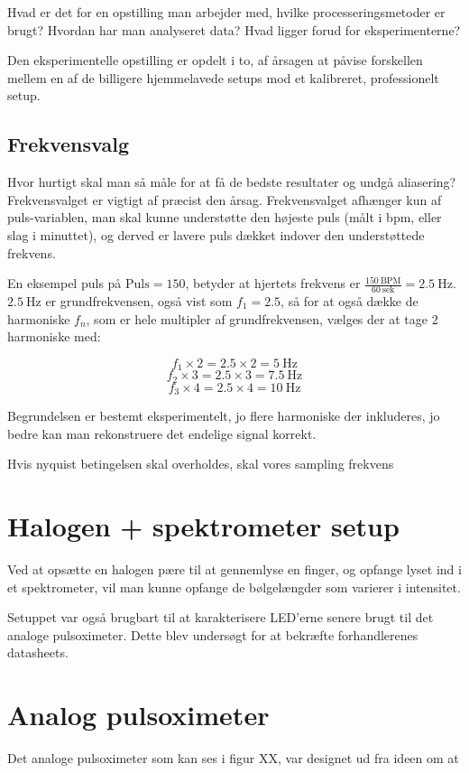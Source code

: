 Hvad er det for en opstilling man arbejder med, hvilke processeringsmetoder er brugt? Hvordan har man analyseret data? Hvad ligger forud for eksperimenterne?

Den eksperimentelle opstilling er opdelt i to, af årsagen at påvise forskellen mellem en af de billigere hjemmelavede setups mod et kalibreret, professionelt setup.

\subsection{Frekvensvalg}

Hvor hurtigt skal man så måle for at få de bedste resultater og undgå aliasering? Frekvensvalget er vigtigt af præcist den årsag. Frekvensvalget afhænger kun af puls-variablen, man skal kunne understøtte den højeste puls (målt i bpm, eller slag i minuttet), og derved er lavere puls dækket indover den understøttede frekvens.

En eksempel puls på $\text{Puls} = 150$, betyder at hjertets frekvens er $\frac{150 \ \text{BPM}}{60 \ \text{sek}} = 2.5 \ \text{Hz}$. $\text{2.5} \ \text{Hz}$ er grundfrekvensen, også vist som $f_1 = 2.5$, så for at også dække de harmoniske $f_n$, som er hele multipler af grundfrekvensen, vælges der at tage 2 harmoniske med: 

$$f_1 \times 2 = 2.5 \times 2 = 5 \ \text{Hz}$$
$$f_2 \times 3 = 2.5 \times 3 = 7.5 \ \text{Hz}$$
$$f_3 \times 4 = 2.5 \times 4 = 10 \ \text{Hz}$$

Begrundelsen er bestemt eksperimentelt, jo flere harmoniske der inkluderes, jo bedre kan man rekonstruere det endelige signal korrekt.

Hvis nyquist betingelsen skal overholdes, skal vores sampling frekvens

\section{Halogen + spektrometer setup}
Ved at opsætte en halogen pære til at gennemlyse en finger, og opfange lyset ind i et spektrometer, vil man kunne opfange de bølgelængder som varierer i intensitet.

Setuppet var også brugbart til at karakterisere LED'erne senere brugt til det analoge pulsoximeter. Dette blev undersøgt for at bekræfte forhandlerenes datasheets.


\section{Analog pulsoximeter}
Det analoge pulsoximeter som kan ses i figur XX, var designet ud fra ideen om at 


